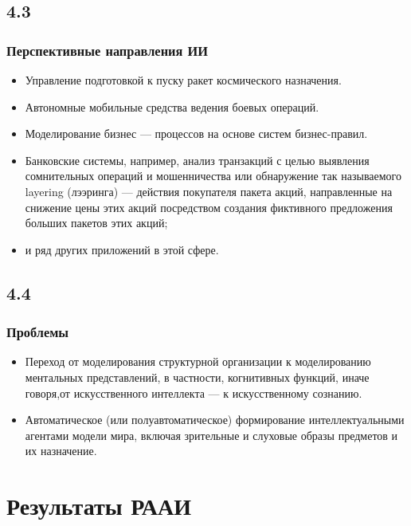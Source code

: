 \documentclass[default]{beamer}
\begin{document}
	\subsection{4.3}
	\begin{frame}
		\frametitle{Перспективные направления ИИ}
		
		\begin{itemize}
			\item Управление подготовкой к пуску ракет космического	назначения.
			\item Автономные мобильные средства ведения боевых операций.
			\item Моделирование бизнес --- процессов на основе систем бизнес-правил.
			\item Банковские системы, например,  анализ транзакций с целью выявления сомнительных операций и  мошенничества или обнаружение так называемого layering (лээринга) --- действия покупателя пакета акций, направленные на снижение цены этих акций посредством создания фиктивного предложения больших пакетов этих акций;
			\item и ряд других приложений в этой сфере.
			
		\end{itemize}
		
	\end{frame}

	\subsection{4.4}
	\begin{frame}
		\frametitle{Проблемы}
		
		\begin{itemize}
			\item Переход от моделирования структурной организации к моделированию ментальных представлений, в частности, когнитивных функций, иначе говоря,от искусственного интеллекта --- к искусственному сознанию.
			\item Автоматическое (или полуавтоматическое) формирование интеллектуальными агентами модели мира, включая зрительные и слуховые образы предметов и их назначение.

		\end{itemize}
		
	\end{frame}

	\section{Результаты РААИ}
\end{document}
